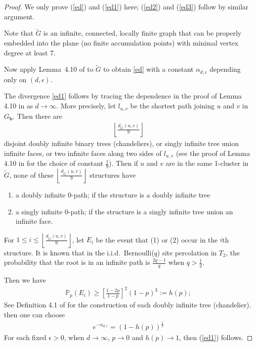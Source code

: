 \documentclass[11pt]{amsart}
\theoremstyle{plain}
\numberwithin{equation}{section}
\numberwithin{figure}{section}
\newcommand\PP{{\mathbb P}}
\begin{document}
\begin{proof}We only prove (\ref{ed}) and (\ref{ed1}) here; (\ref{ed2}) and (\ref{ed3}) follow by similar argument.

Note that $\tilde{G}$ is an infinite, connected, locally finite graph that can be properly embedded into the plane (no finite accumulation points) with minimal vertex degree at least 7. 

Now apply Lemma~4.10 of \cite{ZL231} to $\tilde{G}$ to obtain \eqref{ed}
with a constant $\alpha_{d,\epsilon}$ depending only on $(d,\epsilon)$.

The divergence \eqref{ed1} follows by tracing the dependence in the proof of Lemma 4.10 in \cite{ZL231} as $d\to\infty$.
More precisely, let $l_{u,v}$ be the shortest path joining $u$ and $v$ in $G_{\mathbf{b}}$. Then there are 
\begin{align}
\left\lfloor\frac{d_{\tilde G}(u,v)}{9}\right\rfloor\label{cnt}
\end{align}
disjoint doubly infinite binary trees (chandeliers), or singly infinite tree union infinite faces, or two infinite faces along two sides of $l_{u,v}$ (see the proof of Lemma 4.10 in \cite{ZL231} for the choice of constant $\frac{1}{9}$). Then if $u$ and $v$ are in the same 1-cluster in $\tilde{G}$, none of these 
$\left\lfloor\frac{d_{\tilde{G}}(u,v)}{9}\right\rfloor$ structures have
\begin{enumerate}
\item a doubly infinite 0-path; if the structure is a doubly infinite tree
\item a singly infinite 0-path; if the structure is a singly infinite tree union an infinite face.
\end{enumerate}

For $1\leq i\leq \left\lfloor\frac{d_{\tilde{G}}(u,v)}{9}\right\rfloor$, let $E_i$ be the event that (1) or (2) occur in the $i$th structure. It is known that in the i.i.d.~Bernoulli($q$) site percolation in $T_2$, the probability that the root is in an infinite path is $\frac{2q-1}{q}$ when $q>\frac{1}{2}$. 

Then we have 
\begin{align*}
\PP_p(E_i)\geq \left[\frac{1-2p}{1-p}\right]^2(1-p)^3:=h(p);
\end{align*}
See Definition 4.1 of \cite{ZL231} for the construction of each doubly infinite tree (chandelier). then one can choose
\begin{align*}
e^{-\alpha_{d,\epsilon}}=(1-h(p))^{\frac{1}{9}}
\end{align*}
For each fixed $\epsilon>0$, when $d\rightarrow\infty$, $p\rightarrow 0$ and $h(p)\rightarrow 1$, then (\ref{ed1}) follows.


\end{proof}
\end{document}
